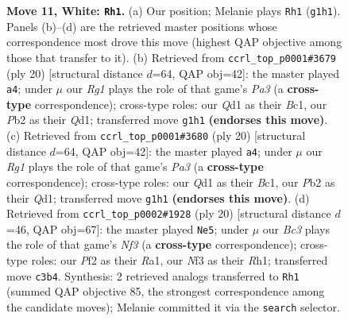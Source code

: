 \documentclass[11pt]{article}
\begin{document}
\begin{figure}[p]
\caption{\textbf{Move 11, White: \texttt{Rh1}.} (a) Our position; Melanie plays \texttt{Rh1} (\texttt{g1h1}). Panels (b)--(d) are the retrieved master positions whose correspondence most drove this move (highest QAP objective among those that transfer to it). (b) Retrieved from \texttt{ccrl\_top\_p0001\#3679} (ply 20) [structural distance $d$=64, QAP obj=42]: the master played \texttt{a4}; under $\mu$ our \emph{Rg1} plays the role of that game's \emph{Pa3} (a \textbf{cross-type} correspondence); cross-type roles: our \emph{Q}d1 as their \emph{B}c1, our \emph{P}b2 as their \emph{Q}d1; transferred move \texttt{g1h1} \textbf{(endorses this move)}. (c) Retrieved from \texttt{ccrl\_top\_p0001\#3680} (ply 20) [structural distance $d$=64, QAP obj=42]: the master played \texttt{a4}; under $\mu$ our \emph{Rg1} plays the role of that game's \emph{Pa3} (a \textbf{cross-type} correspondence); cross-type roles: our \emph{Q}d1 as their \emph{B}c1, our \emph{P}b2 as their \emph{Q}d1; transferred move \texttt{g1h1} \textbf{(endorses this move)}. (d) Retrieved from \texttt{ccrl\_top\_p0002\#1928} (ply 20) [structural distance $d$=46, QAP obj=67]: the master played \texttt{Ne5}; under $\mu$ our \emph{Bc3} plays the role of that game's \emph{Nf3} (a \textbf{cross-type} correspondence); cross-type roles: our \emph{P}f2 as their \emph{R}a1, our \emph{N}f3 as their \emph{R}h1; transferred move \texttt{c3b4}. Synthesis: 2 retrieved analogs transferred to \texttt{Rh1} (summed QAP objective 85, the strongest correspondence among the candidate moves); Melanie committed it via the \texttt{search} selector.}
\label{fig:thought-m20}
\end{figure}

\clearpage
\end{document}
